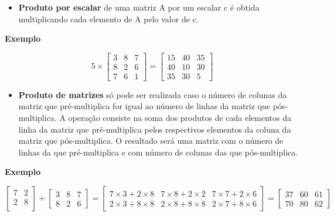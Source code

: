 \documentclass[
]{book}
\providecommand{\tightlist}{%
  \setlength{\itemsep}{0pt}\setlength{\parskip}{0pt}}
\begin{document}
\begin{itemize}
\tightlist
\item
  \textbf{Produto por escalar} de uma matriz A por um escalar c é obtida multiplicando cada elemento de A pelo valor de c.~
\end{itemize}

\textbf{Exemplo}

\begin{equation*}
5 \times
\begin{bmatrix}
3 & 8 & 7\\
8 & 2 & 6\\
7 & 6 & 1
\end{bmatrix} = 
\begin{bmatrix}
15 & 40 & 35\\
40 & 10 & 30\\
35 & 30 & 5
\end{bmatrix}
\end{equation*}

\begin{itemize}
\tightlist
\item
  \textbf{Produto de matrizes} só pode ser realizada caso o número de colunas da matriz que pré-multiplica for igual ao número de linhas da matriz que pós-multiplica. A operação consiste na soma dos produtos de cada elementos da linha da matriz que pré-multiplica pelos respectivos elementos da coluna da matriz que pós-multiplica. O resultado será uma matriz com o número de linhas da que pré-multiplica e com número de colunas das que pós-multiplica.
\end{itemize}

\textbf{Exemplo}

\begin{equation*}
\begin{bmatrix}
7 & 2 \\
2 & 8 \\
\end{bmatrix} + 
\begin{bmatrix}
3 & 8 & 7\\
8 & 2 & 6
\end{bmatrix} = 
\begin{bmatrix}
7 \times 3 + 2 \times 8 & 7 \times 8 + 2 \times 2 & 7 \times 7 + 2 \times 6\\
2 \times 3 + 8 \times 8 & 2 \times 8 + 8 \times 8 & 2 \times 7 + 8 \times 6
\end{bmatrix} =
\begin{bmatrix}
37 & 60 & 61\\
70 & 80 & 62
\end{bmatrix}
\end{equation*}
\end{document}
